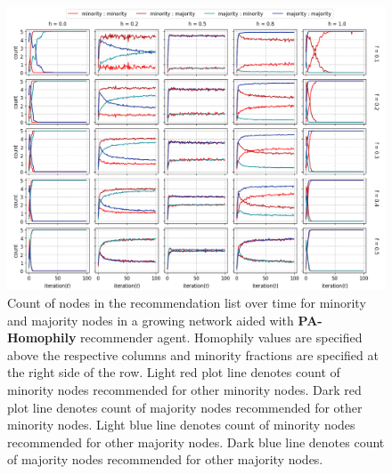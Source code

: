 \begin{appendices}
\begin{figure}[h!]
	\centering
	\includegraphics[width=1.0\textwidth]{images/count_pa.png}
	\caption{Count of nodes in the recommendation list over time for minority and majority nodes in a growing network aided with \textbf{PA-Homophily} recommender agent. Homophily values are specified above the respective columns and minority fractions are specified at the right side of the row. Light red plot line denotes count of minority nodes recommended for other minority nodes. Dark red plot line denotes count of majority nodes recommended for other minority nodes. Light blue line denotes count of minority nodes recommended for other majority nodes. Dark blue line denotes count of majority nodes recommended for other majority nodes.}
	\label{count_pa}
\end{figure}



\end{appendices}

